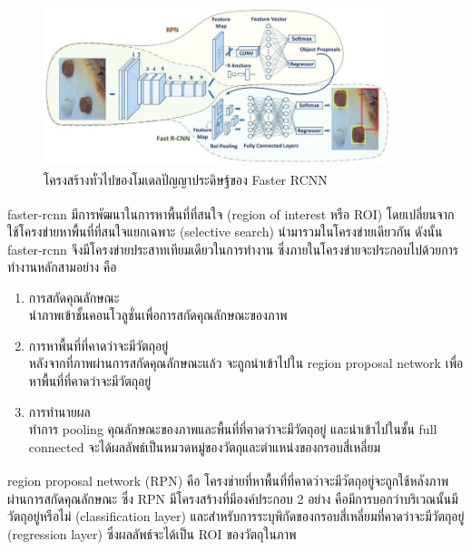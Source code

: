 \begin{figure}[!ht]
    \centering
    \includegraphics[width=0.9\textwidth]{chapter2/images/faster_rcnn.png}
    \caption[โครงสร้างทั่วไปของโมเดลปัญญาประดิษฐ์ของ Faster RCNN]{โครงสร้างทั่วไปของโมเดลปัญญาประดิษฐ์ของ Faster RCNN\textsuperscript{\cite{faster_pic}}}
    \label{fig:faster_rcnn_architecture}
\end{figure}
\par faster-rcnn\textsuperscript{\cite{faster}} มีการพัฒนาในการหาพื้นที่ที่สนใจ (region of interest หรือ ROI) โดยเปลี่ยนจากใช้โครงข่ายหาพื้นที่ที่สนใจแยกเฉพาะ (selective search) นำมารวมในโครงข่ายเดียวกัน 
ดังนั้น faster-rcnn จึงมีโครงข่ายประสาทเทียมเดียวในการทำงาน ซึ่งภายในโครงข่ายจะประกอบไปด้วยการทำงานหลักสามอย่าง คือ
\begin{enumerate}
	\setlength\itemsep{-0.25em}
	\item การสกัดคุณลักษณะ
	\\	นำภาพเข้าชั้นคอนโวลูชั่นเพื่อการสกัดคุณลักษณะของภาพ
	\item การหาพื้นที่ที่คาดว่าจะมีวัตถุอยู่
	\\	หลังจากที่ภาพผ่านการสกัดคุณลักษณะแล้ว จะถูกนำเข้าไปใน region proposal network เพื่อหาพื้นที่ที่คาดว่าจะมีวัตถุอยู่
	\item การทำนายผล
	\\	ทำการ pooling คุณลักษณะของภาพและพื้นที่ที่คาดว่าจะมีวัตถุอยู่ และนำเข้าไปในชั้น full connected จะได้ผลลัพธ์เป็นหมวดหมู่ของวัตถุและตำแหน่งของกรอบสี่เหลี่ยม  
\end{enumerate}
\par region proposal network (RPN)\textsuperscript{\cite{faster}} คือ โครงข่ายที่หาพื้นที่ที่คาดว่าจะมีวัตถุอยู่จะถูกใช้หลังภาพผ่านการสกัดคุณลักษณะ ซึ่ง RPN มีโครงสร้างที่มีองค์ประกอบ 2 อย่าง
คือมีการบอกว่าบริเวณนั้นมีวัตถุอยู่หรือไม่ (classification layer) และสำหรับการระบุพิกัดของกรอบสี่เหลี่ยมที่คาดว่าจะมีวัตถุอยู่ (regression layer) ซึ่งผลลัพธ์จะได้เป็น ROI ของวัตถุในภาพ 